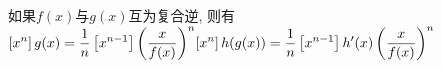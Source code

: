 如果$f(x)$与$g(x)$互为复合逆, 则有 \\
\begin{math}
\begin{aligned}\relax \left[x^n\right]g(x)=\frac{1}{n}\left[x^{n-1}\right]\left(\frac{x}{f(x)}\right)^n\end{aligned} \\
\begin{aligned}\relax \left[x^n\right]h(g(x))=\frac{1}{n}\left[x^{n-1}\right]h'(x)\left(\frac{x}{f(x)}\right)^n\end{aligned}
\end{math}